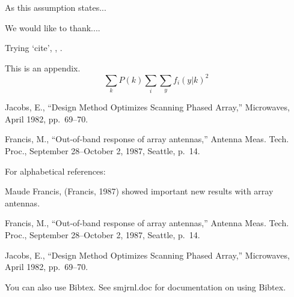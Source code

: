 \begin{article}
As this assumption states...


\acknowledgements
We would like to thank....

Trying `cite', \cite{jacobs}, \cite{francis}.

\appendix{} 


This is an appendix.
\begin{equation}
\sum_k P(k) \sum_i \sum_y f_i(y|k)^2
\end{equation}

\begin{references}
Jacobs, E., ``Design Method Optimizes Scanning
 Phased Array,'' Microwaves, April 1982, pp.\ 69--70.

 Francis, M., ``Out-of-band response of array 
 antennas,'' Antenna Meas.  Tech. Proc., September 28--October 2,
1987, Seattle, p.~14.
\end{references}

For alphabetical references:

Maude Francis, (Francis, 1987) showed important new results
with array antennas.

\begin{alphareferences}
Francis, M., ``Out-of-band response of array 
antennas,'' Antenna Meas.  Tech. Proc., September 28--October 2,
1987, Seattle, p.~14.

Jacobs, E., ``Design Method Optimizes Scanning
Phased Array,'' Microwaves, April 1982, pp.\ 69--70.
\end{alphareferences}

\vskip12pt
You can also use Bibtex. See smjrnl.doc for documentation on 
using Bibtex.




\begin{volumetoc}






\end{volumetoc}
\end{article}
